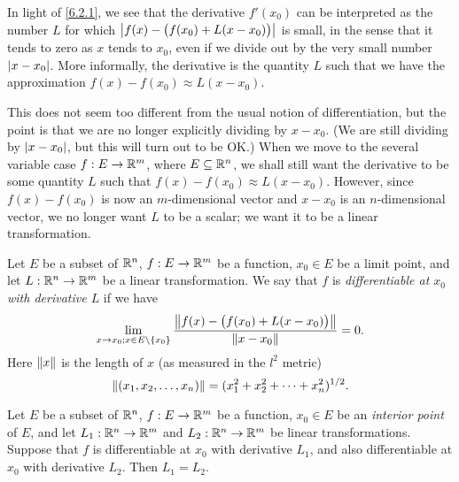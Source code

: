 \begin{note}
  In light of \cref{6.2.1}, we see that the derivative \(f'(x_0)\) can be interpreted as the number \(L\) for which \(\abs{f(x) - \big(f(x_0) + L(x - x_0)\big)}\) is small, in the sense that it tends to zero as \(x\) tends to \(x_0\), even if we divide out by the very small number \(\abs{x - x_0}\).
  More informally, the derivative is the quantity \(L\) such that we have the approximation \(f(x) - f(x_0) \approx L(x - x_0)\).

  This does not seem too different from the usual notion of differentiation, but the point is that we are no longer explicitly dividing by \(x - x_0\).
  (We are still dividing by \(\abs{x - x_0}\), but this will turn out to be OK.)
  When we move to the several variable case \(f : E \to \R^m\), where \(E \subseteq \R^n\), we shall still want the derivative to be some quantity \(L\) such that \(f(x) - f(x_0) \approx L(x - x_0)\).
  However, since \(f(x) - f(x_0)\) is now an \(m\)-dimensional vector and \(x - x_0\) is an \(n\)-dimensional vector, we no longer want \(L\) to be a scalar;
  we want it to be a linear transformation.
\end{note}

\begin{defn}[Differentiability]\label{6.2.2}
  Let \(E\) be a subset of \(\R^n\), \(f : E \to \R^m\) be a function, \(x_0 \in E\) be a limit point, and let \(L : \R^n \to \R^m\) be a linear transformation.
  We say that \(f\) is \emph{differentiable at \(x_0\) with derivative \(L\)} if we have
  \[
    \lim_{x \to x_0 ; x \in E \setminus \{x_0\}} \frac{\norm*{f(x) - \big(f(x_0) + L(x - x_0)\big)}}{\norm*{x - x_0}} = 0.
  \]
  Here \(\norm*{x}\) is the length of \(x\) (as measured in the \(l^2\) metric)
  \[
    \norm*{(x_1, x_2, \dots, x_n)} = (x_1^2 + x_2^2 + \dots + x_n^2)^{1 / 2}.
  \]
\end{defn}

\setcounter{thm}{3}
\begin{lem}\label{6.2.4}
  Let \(E\) be a subset of \(\R^n\), \(f : E \to \R^m\) be a function, \(x_0 \in E\) be an \emph{interior point} of \(E\), and let \(L_1 : \R^n \to \R^m\) and \(L_2 : \R^n \to \R^m\) be linear transformations.
  Suppose that \(f\) is differentiable at \(x_0\) with derivative \(L_1\), and also differentiable at \(x_0\) with derivative \(L_2\).
  Then \(L_1 = L_2\).
\end{lem}


